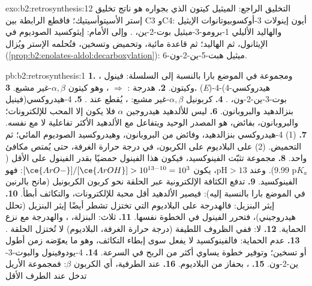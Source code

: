 \begin{solution}{exo:b2:retrosynthesis:12}
التخليق الراجع: الميثيل كيتون الذي بجواره  هو ناتج تخليق
إستر الأسيتوأسيتيك؛ فاقطع الرابطة بين C3 وC4: أيون إينولات 3-أوكسوبيوتانوات الإيثيل والهاليد الأليلي
1-برومو-3-ميثيل بوت-2-ين، . وإلى الأمام: إيثوكسيد الصوديوم في الإيثانول، ثم الهاليد؛
ثم قاعدة مائية، وتحميض وتسخين، فتُحلمه الإستر ويُزال 
(\cref{prop:b2:enolates-aldol:decarboxylation}): 6-ميثيل هبت-5-ين-2-ون.
\end{solution}

\begin{solution}{pb:b2:retrosynthesis:1}
\textbf{1.} ، ومجموعة  في الموضع بارا بالنسبة إلى السلسلة: فينول وكيتون.
\textbf{2.} هدرجة :  $\Rightarrow$ ، وهو كيتون
$\alpha,\beta$-غير مشبع.
\textbf{3.} (\textit{E})-4-(4-هيدروكسي فينيل)بوت-3-ين-2-ون، .
\textbf{4.} كربونيل $\alpha,\beta$-غير مشبع: ، يُقطع عند .
\textbf{5.} 4-هيدروكسي بنزالدهيد والبروبانون.
\textbf{6.} ليس للألدهيد هيدروجين $\alpha$ فلا يكون إلا المحب للإلكترونات؛ والبروبانون،
بفائض، هو المصدر الوحيد  ويتفاعل مع الألدهيد الأكثر تفاعلية لا مع نفسه.
\textbf{7.} (1) 4-هيدروكسي بنزالدهيد، وفائض من البروبانون، وهيدروكسيد الصوديوم المائي؛ ثم التحميض. (2)
 على البلاديوم على الكربون، في درجة حرارة الغرفة، حتى يُمتص مكافئ واحد.
\textbf{8.} مجموعة  تثبّت الفينوكسيد، فيكون هذا الفينول حمضيًا بقدر الفينول على الأقل
($\mathrm pK_a$ 9.99). وعند $\mathrm{pH} > 13$، يكون $[\ce{ArO-}]/[\ce{ArOH}] > 10^{13-10} = 10^3$: فهو
الفينوكسيد.
\textbf{9.} تدفع  الكثافة الإلكترونية عبر الحلقة نحو كربون الكربونيل (مانح
بالرنين في الموضع بارا بالنسبة إليه): فيصير الألدهيد أقل محبة للإلكترونات، والتكاثف أبطأ.
\textbf{10.} إيثر البنزيل: فالهدرجة على البلاديوم التي تختزل  تشطر أيضًا
إيثر البنزيل (تحلل هيدروجيني)، فتحرر الفينول في الخطوة نفسها.
\textbf{11.} ثلاث: البنزلة، ، والهدرجة مع نزع الحماية.
\textbf{12.} لا: ففي الظروف اللطيفة (درجة حرارة الغرفة، البلاديوم) لا تُختزل الحلقة .
\textbf{13.} عدم الحماية: فالفينوكسيد لا يفعل سوى إبطاء التكاثف، وهو ما يعوّضه زمن أطول أو
تسخين؛ وتوفير خطوة يساوي أكثر من الربح في السرعة.
\textbf{14.} 4-يودوفينول والبوت-3-ين-2-ون.
\textbf{15.} ، بحفاز من البلاديوم.
\textbf{16.} عند  الطرفية، أي الكربون $\beta$: فمجموعة الأريل تدخل عند الطرف الأقل

\end{solution}

